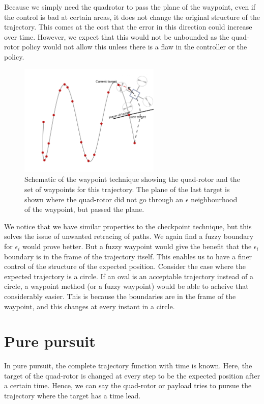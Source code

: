 \documentclass[BTech]{iitmdiss}
\begin{document}
Because we simply need the quadrotor to pass the plane of the waypoint, even if the control is bad at certain areas, it does not change the original structure of the trajectory. This comes at the cost that the error in this direction could increase over time. However, we expect that this would not be unbounded as the quad-rotor policy would not allow this unless there is a flaw in the controller or the policy.

\begin{figure}[h]
  \centering
    \includegraphics[width=0.6\textwidth]{waypoint.png}
    \caption{Schematic of the waypoint technique showing the quad-rotor and the set of waypoints for this trajectory. The plane of the last target is shown where the quad-rotor did not go through an $\epsilon$ neighbourhood of the waypoint, but passed the plane.}
\end{figure}

We notice that we have similar properties to the checkpoint technique, but this solves the issue of unwanted retracing of paths. We again find a fuzzy boundary for $\epsilon_i$ would prove better. But a fuzzy waypoint would give the benefit that the $\epsilon_i$ boundary is in the frame of the trajectory itself. This enables us to have a finer control of the structure of the expected position. Consider the case where the expected trajectory is a circle. If an oval is an acceptable trajectory instead of a circle, a waypoint method (or a fuzzy waypoint) would be able to acheive that considerably easier. This is because the boundaries are in the frame of the waypoint, and this changes at every instant in a circle.

\section{Pure pursuit}

In pure pursuit, the complete trajectory function with time is known. Here, the target of the quad-rotor is changed at every step to be the expected position after a certain time. Hence, we can say the quad-rotor or payload tries to pursue the trajectory where the target has a time lead.
\end{document}
